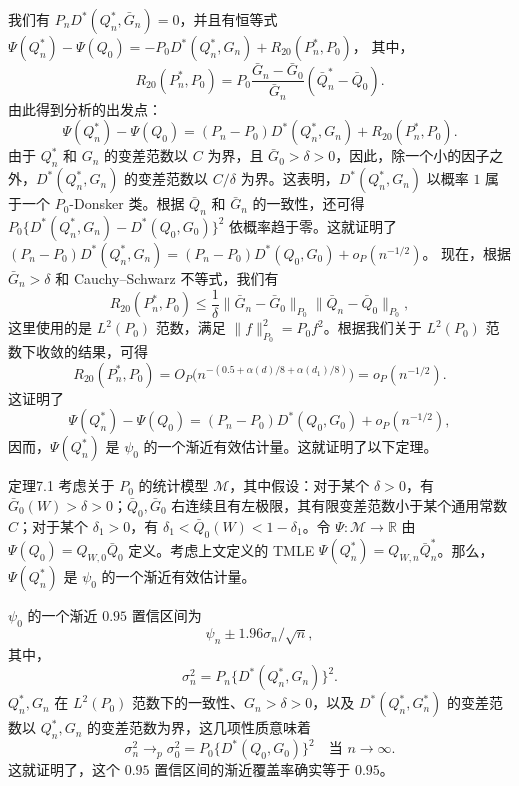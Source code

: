 我们有 $P_nD^*(Q_n^*,\bar G_n)=0$，并且有恒等式
$\Psi(Q_n^*)-\Psi(Q_0)=-P_0D^*(Q_n^*,G_n)+R_{20}(P_n^*,P_0)$，
其中，
\[
 R_{20}(P_n^*,P_0)
 =P_0\frac{\bar G_n-\bar G_0}{\bar G_n}(\bar Q_n^*-\bar Q_0).
\]
由此得到分析的出发点：
\[
 \Psi(Q_n^*)-\Psi(Q_0)
 =(P_n-P_0)D^*(Q_n^*,G_n)+R_{20}(P_n^*,P_0).
\]
由于 $Q_n^*$ 和 $G_n$ 的变差范数以 $C$ 为界，且 $\bar G_0>\delta>0$，因此，除一个小的因子之外，$D^*(Q_n^*,G_n)$ 的变差范数以 $C/\delta$ 为界。这表明，$D^*(Q_n^*,G_n)$ 以概率 $1$ 属于一个 $P_0$-Donsker 类。根据 $\bar Q_n$ 和 $\bar G_n$ 的一致性，还可得
$P_0\{D^*(Q_n^*,G_n)-D^*(Q_0,G_0)\}^2$
依概率趋于零。这就证明了
$(P_n-P_0)D^*(Q_n^*,G_n)
 =(P_n-P_0)D^*(Q_0,G_0)+o_P(n^{-1/2})$。
现在，根据 $\bar G_n>\delta$ 和 Cauchy--Schwarz 不等式，我们有
\[
 R_{20}(P_n^*,P_0)
 \leq\frac1\delta
 \|\bar G_n-\bar G_0\|_{P_0}\|\bar Q_n-\bar Q_0\|_{P_0},
\]
这里使用的是 $L^2(P_0)$ 范数，满足 $\|f\|_{P_0}^2=P_0f^2$。根据我们关于 $L^2(P_0)$ 范数下收敛的结果，可得
\[
 R_{20}(P_n^*,P_0)
 =O_P\bigl(n^{-(0.5+\alpha(d)/8+\alpha(d_1)/8)}\bigr)
 =o_P(n^{-1/2}).
\]
这证明了
\[
 \Psi(Q_n^*)-\Psi(Q_0)
 =(P_n-P_0)D^*(Q_0,G_0)+o_P(n^{-1/2}),
\]
因而，$\Psi(Q_n^*)$ 是 $\psi_0$ 的一个渐近有效估计量。这就证明了以下定理。

\begin{bookresult}{定理}{7.1}
考虑关于 $P_0$ 的统计模型 $\mathcal M$，其中假设：对于某个 $\delta>0$，有 $\bar G_0(W)>\delta>0$；$\bar Q_0,\bar G_0$ 右连续且有左极限，其有限变差范数小于某个通用常数 $C$；对于某个 $\delta_1>0$，有 $\delta_1<\bar Q_0(W)<1-\delta_1$。令 $\Psi:\mathcal M\to\mathbb R$ 由 $\Psi(Q_0)=Q_{W,0}\bar Q_0$ 定义。考虑上文定义的 TMLE $\Psi(Q_n^*)=Q_{W,n}\bar Q_n^*$。那么，$\Psi(Q_n^*)$ 是 $\psi_0$ 的一个渐近有效估计量。
\end{bookresult}

$\psi_0$ 的一个渐近 $0.95$ 置信区间为
\[
 \psi_n\pm1.96\sigma_n/\sqrt n,
\]
其中，
\[
 \sigma_n^2=P_n\{D^*(Q_n^*,G_n)\}^2.
\]
$Q_n^*,G_n$ 在 $L^2(P_0)$ 范数下的一致性、$G_n>\delta>0$，以及 $D^*(Q_n^*,G_n^*)$ 的变差范数以 $Q_n^*,G_n$ 的变差范数为界，这几项性质意味着
\[
 \sigma_n^2\to_p\sigma_0^2=P_0\{D^*(Q_0,G_0)\}^2
 \quad\text{当 }n\to\infty.
\]
这就证明了，这个 $0.95$ 置信区间的渐近覆盖率确实等于 $0.95$。

